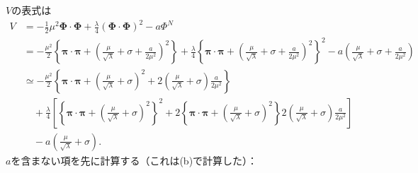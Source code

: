 $V$の表式は
\begin{align*}
  V &= -\frac{1}{2} \mu^2 \boldsymbol\Phi \cdot \boldsymbol\Phi + \frac{\lambda}{4} (\boldsymbol\Phi \cdot \boldsymbol\Phi)^2 - a \Phi^N \\
  &= -\frac{\mu^2}{2} \left\{ \boldsymbol\pi \cdot \boldsymbol\pi + \left( \frac{\mu}{\sqrt{\lambda}} + \sigma + \frac{a}{2\mu^2} \right)^2 \right\}
  + \frac{\lambda}{4} \left\{ \boldsymbol\pi \cdot \boldsymbol\pi + \left( \frac{\mu}{\sqrt{\lambda}} + \sigma + \frac{a}{2\mu^2} \right)^2 \right\}^2
  - a \left( \frac{\mu}{\sqrt{\lambda}} + \sigma + \frac{a}{2\mu^2} \right) \\
  &\simeq -\frac{\mu^2}{2} \left\{ \boldsymbol\pi \cdot \boldsymbol\pi + \left( \frac{\mu}{\sqrt{\lambda}} + \sigma\right)^2 + 2 \left( \frac{\mu}{\sqrt{\lambda}} + \sigma\right)\frac{a}{2\mu^2} \right\} \\
  & \quad + \frac{\lambda}{4} \left[ \left\{ \boldsymbol\pi \cdot \boldsymbol\pi + \left( \frac{\mu}{\sqrt{\lambda}} + \sigma\right)^2 \right\}^2
  + 2 \left\{ \boldsymbol\pi \cdot \boldsymbol\pi + \left( \frac{\mu}{\sqrt{\lambda}} + \sigma\right)^2 \right\} 2 \left( \frac{\mu}{\sqrt{\lambda}} + \sigma\right)\frac{a}{2\mu^2} \right] \\
  & \quad - a \left( \frac{\mu}{\sqrt{\lambda}} + \sigma \right).
\end{align*}
$a$を含まない項を先に計算する（これは(b)で計算した）：
